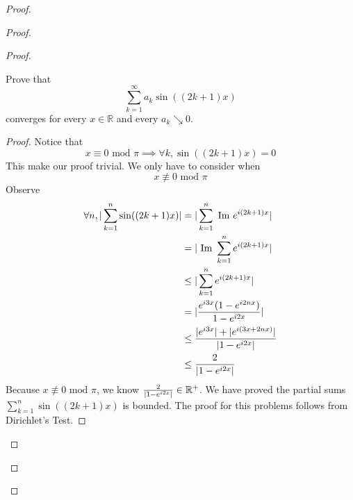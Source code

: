 \documentclass{report}
\begin{document}
\begin{proof}
\begin{proof}
\begin{proof}
\begin{question}{}{}
Prove that 
\[
\sum_{k=1}^{\infty} a_k \sin((2k + 1)x)
\]
converges for every \( x \in \mathbb{R} \) and every \( a_k \searrow 0 \).
\end{question}
\begin{proof}
Notice that  
\begin{equation}
x\equiv 0\text{ mod $\pi$}\implies \forall k,\sin ((2k+1)x)=0
\end{equation}
This make our proof trivial. We only have to consider when 
\begin{equation}
x\not\equiv 0\text{ mod }\pi
\end{equation}
Observe
\begin{align}
 \forall n, |\sum_{k=1}^n \sin((2k+1)x)|&= |\sum_{k=1}^n \text{ Im }e^{i(2k+1)x}|\\
  &=|\text{ Im }\sum_{k=1}^n e^{i(2k+1)x}|\\
  &\leq |\sum_{k=1}^n e^{i(2k+1)x}|\\
  &=|\frac{e^{i3x}(1-e^{i2nx})}{1-e^{i2x}}|\\
  &\leq \frac{|e^{i3x}|+|e^{i(3x+2nx)}|}{|1-e^{i2x}|}\\
  &\leq \frac{2}{|1-e^{i 2x}|}
\end{align}
Because $x\not\equiv 0\text{ mod $\pi$}$, we know $\frac{2}{|1-e^{i2x}|}\in\mathbb{R}^+$. We have proved the partial sums $\sum_{k=1}^n \sin((2k+1)x)$ is bounded. The proof for this problems follows from Dirichlet's Test.

\end{proof}


\end{proof}
\end{proof}
\end{proof}
\end{document}
